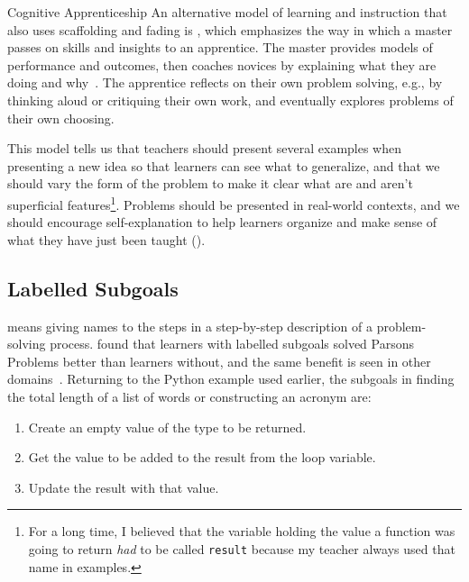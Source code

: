 \begin{aside}{Cognitive Apprenticeship}
  An alternative model of learning and instruction that also uses scaffolding and fading
  is ,
  which emphasizes the way in which a master passes on skills and insights to an apprentice.
  The master provides models of performance and outcomes,
  then coaches novices by explaining what they are doing and why~\cite{Coll1991,Casp2007}.
  The apprentice reflects on their own problem solving,
  e.g.,
  by thinking aloud or critiquing their own work,
  and eventually explores problems of their own choosing.

  This model tells us that
  teachers should present several examples when presenting a new idea
  so that learners can see what to generalize,
  and that we should vary the form of the problem to make it clear
  what are and aren't superficial features\footnote{For a long time,
    I believed that the variable holding the value a function was going to return
    \emph{had} to be called \texttt{result}
    because my teacher always used that name in examples.}.
  Problems should be presented in real-world contexts,
  and we should encourage self-explanation to help learners organize and make sense of what they have just been taught
  ().
\end{aside}

\subsection*{Labelled Subgoals}

 means
giving names to the steps in a step-by-step description of a problem-solving process.
\cite{Marg2016,Morr2016} found that learners with labelled subgoals
solved Parsons Problems better than learners without,
and the same benefit is seen in other domains~\cite{Marg2012}.
Returning to the Python example used earlier,
the subgoals in finding the total length of a list of words or constructing an acronym are:

\begin{enumerate}

\item
  Create an empty value of the type to be returned.

\item
  Get the value to be added to the result from the loop variable.

\item
  Update the result with that value.

\end{enumerate}

